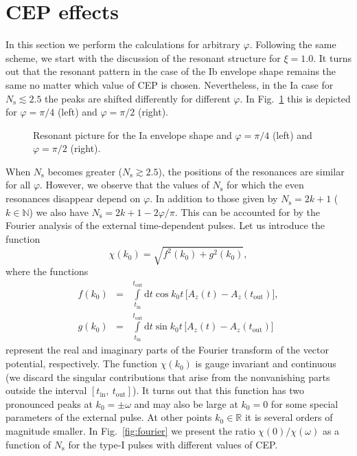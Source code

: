 \documentclass[preprint,aps,prd,showpacs,floatfix]{revtex4-1}
\begin{document}
\section{CEP effects}\label{sec:cep}
In this section we perform the calculations for arbitrary $\varphi$. Following the same scheme, we start with the discussion of the resonant structure for $\xi = 1.0$. It turns out that the resonant pattern in the case of the Ib envelope shape remains the same no matter which value of CEP is chosen. Nevertheless, in the Ia case for $N_\text{s} \lesssim 2.5$ the peaks are shifted differently for different $\varphi$. In Fig.~\ref{fig:res_Ia_cep} this is depicted for $\varphi = \pi/4$ (left) and $\varphi = \pi/2$ (right).
%
\begin{figure}[h]
\caption{Resonant picture for the Ia envelope shape and $\varphi = \pi/4$ (left) and $\varphi = \pi/2$ (right).}
\label{fig:res_Ia_cep}
\end{figure}
%
When $N_\text{s}$ becomes greater ($N_\text{s} \gtrsim 2.5$), the positions of the resonances are similar for all $\varphi$. However, we observe that the values of $N_\text{s}$ for which the even resonances disappear depend on $\varphi$. In addition to those given by $N_\text{s} = 2k + 1$ ($k \in \mathbb{N}$) we also have $N_\text{s} = 2k + 1 - 2\varphi/\pi$. This can be accounted for by the Fourier analysis of the external time-dependent pulses. Let us introduce the function
%
\begin{equation}
\chi (k_0) = \sqrt{f^2 (k_0) + g^2 (k_0)},
\label{eq:fourier_chi}
\end{equation}
%
where the functions
%
\begin{eqnarray}
f(k_0) &=& \int \limits_{t_\text{in}}^{t_\text{out}} \mathrm{d} t \cos k_0 t \, \big [A_z(t) - A_z (t_\text{out}) \big ], \label{eq:fourier_f}\\
g(k_0) &=& \int \limits_{t_\text{in}}^{t_\text{out}} \mathrm{d} t \sin k_0 t \, \big [A_z(t) - A_z (t_\text{out}) \big ] \label{eq:fourier_g}
\end{eqnarray}
%
represent the real and imaginary parts of the Fourier transform of the vector potential, respectively. The function $\chi (k_0)$ is gauge invariant and continuous (we discard the singular contributions that arise from the nonvanishing parts outside the interval $[t_\text{in},~t_\text{out}]$). It turns out that this function has two pronounced peaks at $k_0 = \pm \omega$ and may also be large at $k_0 = 0$ for some special parameters of the external pulse. At other points $k_0 \in \mathbb{R}$ it is several orders of magnitude smaller. In Fig.~\ref{fig:fourier} we present the ratio $\chi (0)/\chi (\omega)$ as a function of $N_\text{s}$ for the type-I pulses with different values of CEP.
\end{document}
